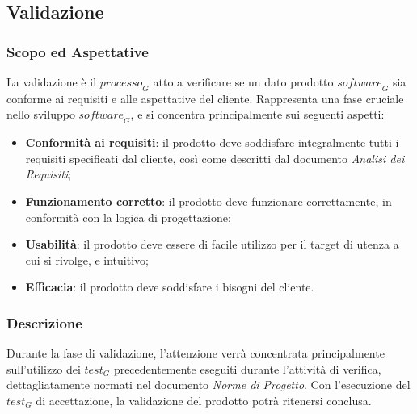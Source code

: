 \subsection{Validazione}
\subsubsection{Scopo ed Aspettative}
La validazione è il $\textit{processo}_G$ atto a verificare se un dato prodotto $\textit{software}_G$ sia conforme ai requisiti e alle aspettative del cliente. Rappresenta una fase cruciale nello sviluppo $\textit{software}_G$, e si concentra principalmente sui seguenti aspetti:
\begin{itemize}
    \item \textbf{Conformità ai requisiti}: il prodotto deve soddisfare integralmente tutti i requisiti specificati dal
cliente, così come descritti dal documento \textit{Analisi dei Requisiti};
    \item \textbf{Funzionamento corretto}: il prodotto deve funzionare correttamente, in conformità con la logica di
progettazione;
    \item \textbf{Usabilità}: il prodotto deve essere di facile utilizzo per il target di utenza a cui si rivolge, e intuitivo;
    \item \textbf{Efficacia}: il prodotto deve soddisfare i bisogni del cliente. 
\end{itemize}

\subsubsection{Descrizione}
Durante la fase di validazione, l'attenzione verrà concentrata principalmente sull'utilizzo dei $\textit{test}_G$ precedentemente eseguiti durante l'attività di verifica, dettagliatamente normati nel documento \textit{Norme di Progetto}. Con l'esecuzione del $\textit{test}_G$ di accettazione, la validazione del prodotto potrà ritenersi conclusa.